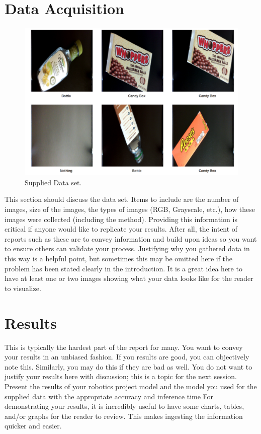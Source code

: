 \documentclass[10pt,journal,compsoc]{IEEEtran}
\begin{document}
\section{Data Acquisition}
\begin{figure}[thpb]
      \centering
      \includegraphics[width=\linewidth]{suplieDataset.png}
      \caption{Supplied Data set.}
      \label{fig:robot1}
\end{figure}
This section should discuss the data set. Items to include are the number of images, size of the images, the types of images (RGB, Grayscale, etc.), how these images were collected (including the method). Providing this information is critical if anyone would like to replicate your results. After all, the intent of reports such as these are to convey information and build upon ideas so you want to ensure others can validate your process.
Justifying why you gathered data in this way is a helpful point, but sometimes this may be omitted here if the problem has been stated clearly in the introduction.
It is a great idea here to have at least one or two images showing what your data looks like for the reader to visualize.

\section{Results}
This is typically the hardest part of the report for many. You want to convey your results in an unbiased fashion. If you results are good, you can objectively note this. Similarly, you may do this if they are bad as well. You do not want to justify your results here with discussion; this is a topic for the next session. 
Present the results of your robotics project model and the model you used for the supplied data with the appropriate accuracy and inference time
For demonstrating your results, it is incredibly useful to have some charts, tables, and/or graphs for the reader to review. This makes ingesting the information quicker and easier.
\end{document}
